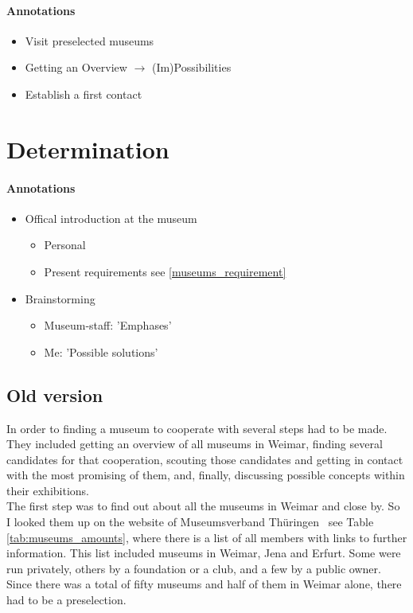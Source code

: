 \paragraph{Annotations}

\begin{itemize}
	\item Visit preselected museums
	\item Getting an Overview $\to$ (Im)Possibilities
	\item Establish a first contact
\end{itemize}



\section{Determination}
\label{museums_determination}

\paragraph{Annotations}

\begin{itemize}
	\item Offical introduction at the museum
	\begin{itemize}
		\item Personal
		\item Present requirements see \ref{museums_requirement}
	\end{itemize}
	\item Brainstorming
	\begin{itemize}
		\item Museum-staff: 'Emphases'
		\item Me: 'Possible solutions'
	\end{itemize}
\end{itemize}



\subsection*{Old version}

In order to finding a museum to cooperate with several steps had to be made. They included getting an overview of all museums in Weimar, finding several candidates for that cooperation, scouting those candidates and getting in contact with the most promising of them, and, finally, discussing possible concepts within their exhibitions.
\\
The first step was to find out about all the museums in Weimar and close by. So I looked them up on the website of Museumsverband Thüringen~\cite{ThueringerMuseumsverbandOrte} see Table \ref{tab:museums_amounts}, where there is a list of all members with links to further information. This list included museums in Weimar, Jena and Erfurt. Some were run privately, others by a foundation or a club, and a few by a public owner. Since there was a total of fifty museums and half of them in Weimar alone, there had to be a preselection.

